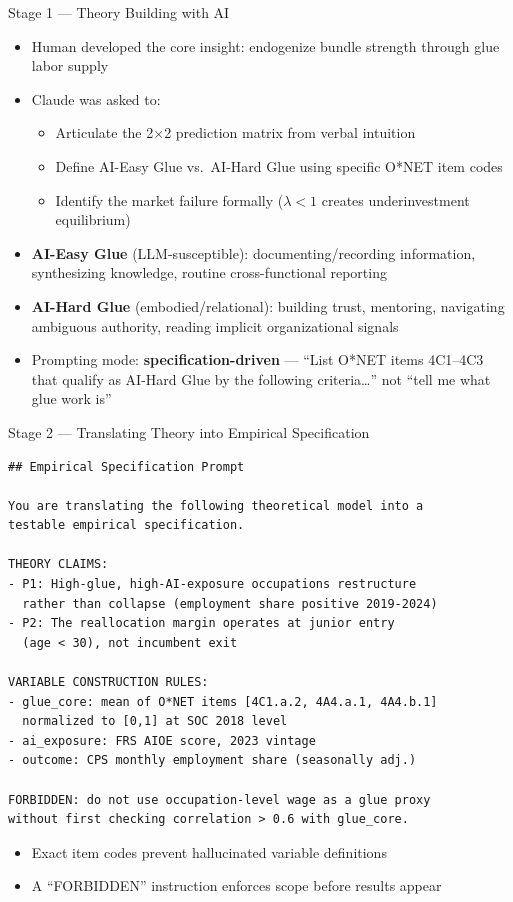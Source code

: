 \documentclass[10pt,english,aspectratio=169]{beamer}
\begin{document}
\begin{frame}{Stage 1 --- Theory Building with AI}
\begin{itemize}
  \item Human developed the core insight: endogenize bundle strength through glue labor supply
  \item Claude was asked to:
    \begin{itemize}
      \item Articulate the 2$\times$2 prediction matrix from verbal intuition
      \item Define AI-Easy Glue vs.\ AI-Hard Glue using specific O*NET item codes
      \item Identify the market failure formally ($\lambda < 1$ creates underinvestment equilibrium)
    \end{itemize}
  \item \textbf{AI-Easy Glue} (LLM-susceptible): documenting/recording information, synthesizing knowledge, routine cross-functional reporting
  \item \textbf{AI-Hard Glue} (embodied/relational): building trust, mentoring, navigating ambiguous authority, reading implicit organizational signals
  \item Prompting mode: \textbf{specification-driven} --- ``List O*NET items 4C1--4C3 that qualify as AI-Hard Glue by the following criteria\ldots'' not ``tell me what glue work is''
\end{itemize}
\end{frame}

\begin{frame}[fragile]{Stage 2 --- Translating Theory into Empirical Specification}
\begin{lstlisting}[style=markdownstyle, basicstyle=\tiny\ttfamily]
## Empirical Specification Prompt

You are translating the following theoretical model into a
testable empirical specification.

THEORY CLAIMS:
- P1: High-glue, high-AI-exposure occupations restructure
  rather than collapse (employment share positive 2019-2024)
- P2: The reallocation margin operates at junior entry
  (age < 30), not incumbent exit

VARIABLE CONSTRUCTION RULES:
- glue_core: mean of O*NET items [4C1.a.2, 4A4.a.1, 4A4.b.1]
  normalized to [0,1] at SOC 2018 level
- ai_exposure: FRS AIOE score, 2023 vintage
- outcome: CPS monthly employment share (seasonally adj.)

FORBIDDEN: do not use occupation-level wage as a glue proxy
without first checking correlation > 0.6 with glue_core.
\end{lstlisting}
\footnotesize
\begin{itemize}
  \item Exact item codes prevent hallucinated variable definitions
  \item A ``FORBIDDEN'' instruction enforces scope before results appear
\end{itemize}
\end{frame}
\end{document}
